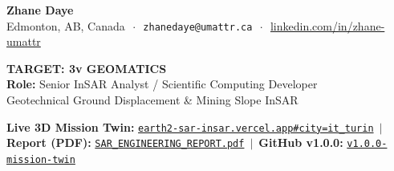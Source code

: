 \documentclass[10pt,letterpaper]{article}
\begin{document}
\begin{tcolorbox}[colframe=threevblue,colback=threevblue,coltext=white,boxrule=0pt,top=6pt,bottom=6pt]
\begin{minipage}[c]{0.58\textwidth}
    {\Large\textbf{Zhane Daye}} \\[2pt]
    {\footnotesize Edmonton, AB, Canada $\,\cdot\,$ \texttt{zhanedaye@umattr.ca} $\,\cdot\,$ \href{https://www.linkedin.com/in/zhane-umattr}{linkedin.com/in/zhane-umattr}}
\end{minipage}
\hfill
\begin{minipage}[c]{0.40\textwidth}
    \raggedleft
    {\large\textbf{TARGET: 3v GEOMATICS}}\\[1pt]
    {\footnotesize\textbf{Role:} Senior InSAR Analyst / Scientific Computing Developer}\\[1pt]
    {\scriptsize Geotechnical Ground Displacement \& Mining Slope InSAR}
\end{minipage}
\end{tcolorbox}

\vspace{-4pt}

\begin{tcolorbox}[colframe=bordergray,colback=lightbg,top=3pt,bottom=3pt]
\footnotesize
\textbf{Live 3D Mission Twin:} \href{https://earth2-sar-insar.vercel.app#city=it_turin&preset=extreme_weather&stage=v3}{\texttt{earth2-sar-insar.vercel.app\#city=it\_turin}} $\,\vert\,$ 
\textbf{Report (PDF):} \href{https://earth2-sar-insar.vercel.app/reports/EARTH2_X_BAND_SAR_INSAR_ENGINEERING_REPORT.pdf}{\texttt{SAR\_ENGINEERING\_REPORT.pdf}} $\,\vert\,$ 
\textbf{GitHub v1.0.0:} \href{https://github.com/zrt219/earth2studio/releases/tag/v1.0.0-mission-twin}{\texttt{v1.0.0-mission-twin}}
\end{tcolorbox}

\vspace{-4pt}
\end{document}

